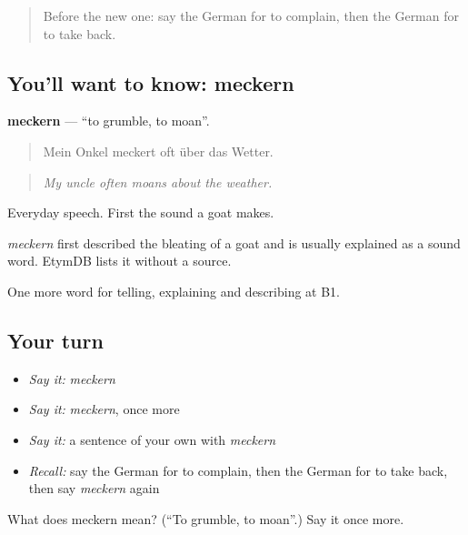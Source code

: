\begin{quote}
Before the new one: say the German for to complain, then the German for to take back.
\end{quote}

\subsection*{You'll want to know: meckern}
\textbf{meckern} — \textquotedblleft{}to grumble, to moan\textquotedblright{}.

\begin{quote}
Mein Onkel meckert oft über das Wetter.
\end{quote}

\begin{quote}
\emph{My uncle often moans about the weather.}
\end{quote}

Everyday speech. First the sound a goat makes.

\begin{cousinweb}
\emph{meckern} first described the bleating of a goat and is usually explained as a sound word. EtymDB lists it without a source.
\end{cousinweb}

\begin{grammarlens}[title={What you've built}]
One more word for telling, explaining and describing at B1.
\end{grammarlens}

\subsection*{Your turn}
\begin{itemize}
\raggedright
  \item \emph{Say it:} \emph{meckern}
  \item \emph{Say it:} \emph{meckern}, once more
  \item \emph{Say it:} a sentence of your own with \emph{meckern}
  \item \emph{Recall:} say the German for to complain, then the German for to take back, then say \emph{meckern} again
\end{itemize}

\begin{tcolorbox}[breakable,colback=teal!4,colframe=teal!35!black,title={Before you move on}]
What does meckern mean? (\textquotedblleft{}To grumble, to moan\textquotedblright{}.) Say it once more.
\end{tcolorbox}
